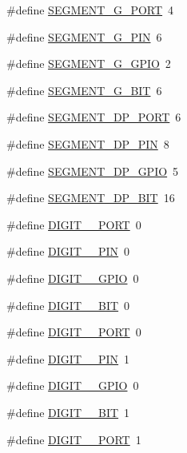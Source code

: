 \begin{DoxyCompactItemize}
\item 
\#define \hyperlink{group__hal_ga089beff59c1a1594c602a3f1668a5cae}{S\+E\+G\+M\+E\+N\+T\+\_\+\+G\+\_\+\+P\+O\+RT}~4
\item 
\#define \hyperlink{group__hal_ga3281b5b95b4c76fc422873c7b9d0c39a}{S\+E\+G\+M\+E\+N\+T\+\_\+\+G\+\_\+\+P\+IN}~6
\item 
\#define \hyperlink{group__hal_gaea3bf9c5df901e959eeb0e906c5dfac6}{S\+E\+G\+M\+E\+N\+T\+\_\+\+G\+\_\+\+G\+P\+IO}~2
\item 
\#define \hyperlink{group__hal_ga75f6e2dae6677f4ddad5120a1b66f2d7}{S\+E\+G\+M\+E\+N\+T\+\_\+\+G\+\_\+\+B\+IT}~6
\item 
\#define \hyperlink{group__hal_gaaee9c92a11acc12e3774fee38fb36238}{S\+E\+G\+M\+E\+N\+T\+\_\+\+D\+P\+\_\+\+P\+O\+RT}~6
\item 
\#define \hyperlink{group__hal_gad543e608ea7a2ca92dc3420ce3240333}{S\+E\+G\+M\+E\+N\+T\+\_\+\+D\+P\+\_\+\+P\+IN}~8
\item 
\#define \hyperlink{group__hal_gace15163ca1e16645042e31aaf4f2cafb}{S\+E\+G\+M\+E\+N\+T\+\_\+\+D\+P\+\_\+\+G\+P\+IO}~5
\item 
\#define \hyperlink{group__hal_gaff4184966fc4e46492d5c3fc98a38b06}{S\+E\+G\+M\+E\+N\+T\+\_\+\+D\+P\+\_\+\+B\+IT}~16
\item 
\#define \hyperlink{group__hal_ga78f52a22c98f23423dcda6b28779114b}{D\+I\+G\+I\+T\+\_\+\_\+\+P\+O\+RT}~0
\item 
\#define \hyperlink{group__hal_ga9200506b5f69d0208deeb2061bbfe308}{D\+I\+G\+I\+T\+\_\+\_\+\+P\+IN}~0
\item 
\#define \hyperlink{group__hal_gae5605c3ac9f4ce97d2bc363826d8fc7f}{D\+I\+G\+I\+T\+\_\+\_\+\+G\+P\+IO}~0
\item 
\#define \hyperlink{group__hal_ga1a1fa96ee3948f90d84ecfaf2c4f76a4}{D\+I\+G\+I\+T\+\_\+\_\+\+B\+IT}~0
\item 
\#define \hyperlink{group__hal_gaa92df493e248da0cfeaf755bd7239f21}{D\+I\+G\+I\+T\+\_\+\_\+\+P\+O\+RT}~0
\item 
\#define \hyperlink{group__hal_ga018d49ac62ace8d1df56f43a936bb236}{D\+I\+G\+I\+T\+\_\+\_\+\+P\+IN}~1
\item 
\#define \hyperlink{group__hal_gacfbaeac627d0ed6499c0e3622e81f065}{D\+I\+G\+I\+T\+\_\+\_\+\+G\+P\+IO}~0
\item 
\#define \hyperlink{group__hal_ga7bfe5eb0b3af9a09b591c9da8006a4c5}{D\+I\+G\+I\+T\+\_\+\_\+\+B\+IT}~1
\item 
\#define \hyperlink{group__hal_ga94523606bb277125408e8d824039941d}{D\+I\+G\+I\+T\+\_\+\_\+\+P\+O\+RT}~1

\end{DoxyCompactItemize}
